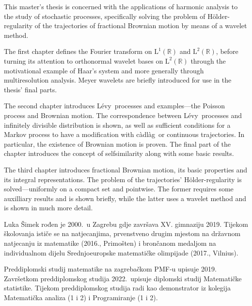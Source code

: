 \documentclass[a4paper,twoside,12pt]{memoir}
\numberwithin{teorem}{section}
\numberwithin{equation}{chapter}
\numberwithin{figure}{chapter}
\numberwithin{table}{chapter}
\newcommand{\R}{\mathbb{R}}
\newcommand{\holder}{H\" older}
\newcommand{\cadlag}{c\` adl\` ag}
\newcommand{\levy}{L\' evy}
\def\L{\mathrm{L}}
\begin{document}
\begin{summary}
	This master's thesis is concerned with the applications of harmonic analysis to the study
	of stochastic processes, specifically solving the problem of \holder -regularity of the trajectories
	of fractional Brownian motion by means of a wavelet method.

	The first chapter defines the Fourier transform on \( \L^1(\R) \) and
	\( \L^2(\R) \), before turning its attention to orthonormal wavelet bases
	on \( \L^2(\R) \) through the motivational example of Haar's system and
	more generally through multiresolution analysis. Meyer wavelets are briefly introduced
	for use in the thesis' final parts.

	The second chapter introduces \levy \ processes and examples---the Poisson process and
	Brownian motion. The correspondence between \levy \ processes and infinitely divisible
	distribution is shown, as well as sufficient conditions for a Markov process to have a
	modification with \cadlag \ or continuous trajectories. In particular, the existence of
	Brownian motion is proven. The final part of the chapter introduces
	the concept of selfsimilarity along with some basic results.

	The third chapter introduces fractional Brownian motion, its basic properties and
	its integral representations. The problem of the trajectories' \holder -regularity
	is solved---uniformly on a compact set and pointwise. The former
	requires some auxilliary results and is shown briefly, while the latter
	uses a wavelet method and is shown in much more detail.
\end{summary}

\begin{cv}
	Luka Šimek rođen je 2000.\ u Zagrebu gdje završava XV. gimnaziju 2019. Tijekom školovanja ističe se na natjecanjima, prvenstveno drugim mjestom na državnom natjecanju iz matematike (2016., Primošten) i brončanom medaljom na individualnom dijelu Srednjoeuropske matematičke olimpijade (2017., Vilnius).

	Preddiplomski studij matematike na zagrebačkom PMF-u upisuje 2019. Završetkom preddiplomskog studija 2022.\ upisuje diplomski studij Matematičke statistike. Tijekom preddiplomskog studija radi kao demonstrator iz kolegija Matematička analiza (1 i 2) i Programiranje (1 i 2).
\end{cv}
\end{document}
